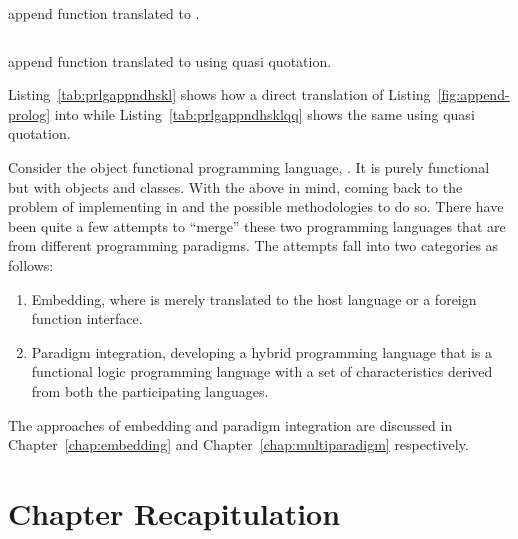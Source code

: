 \documentclass[thesis-solanki.tex]{subfiles}
\begin{document}
\begin{code-list}[th]
  \begin{singlespace}
    \inputminted[linenos]{haskell}{append.pl}
  \end{singlespace}
  \caption{ append function translated to .}
\label{tab:prlgappndhskl}
\end{code-list}

\begin{code-list}[th]
  \begin{singlespace}
    \inputminted[linenos]{haskell}{append_quasi_quote.hs}
  \end{singlespace}
  \caption{ append function translated to  using quasi quotation.}
\label{tab:prlgappndhsklqq}
\end{code-list}



Listing~\ref{tab:prlgappndhskl} shows how a direct translation of Listing~\ref{fig:append-prolog} into  while 
Listing~\ref{tab:prlgappndhsklqq} shows the same using quasi quotation. 

Consider the object functional programming language, 
\cite{website:scala}.
It is purely functional but with objects and classes.
With the above in mind, coming back to the problem of implementing  in  and the possible 
methodologies to do so.
There have been quite a few attempts to ``merge'' these two programming languages that are from different programming
paradigms.
The attempts fall into two categories as follows:

\begin{enumerate}
\item
  Embedding, where  is merely translated to the host language  or a foreign
  function interface.

\item
  Paradigm integration, developing a hybrid programming language that is a functional logic programming language
  with a set of characteristics derived from both the participating languages.
\end{enumerate}

The approaches of embedding and paradigm integration are discussed in Chapter~\ref{chap:embedding} and Chapter~\ref{chap:multiparadigm} 
respectively.  

\section{Chapter Recapitulation}




\ifMain
\begin{scope}
  \nolinenumbers
  \enotesize
  \par
  \begin{singlespace}
  \setlength{\parskip}{12pt plus 2pt minus 1pt}
  \theendnotes
  \par
  \end{singlespace}
\end{scope}
\fi
\end{document}
